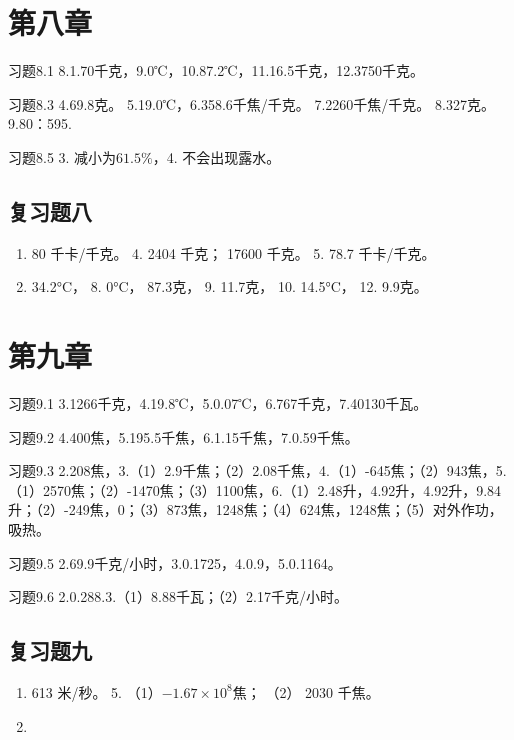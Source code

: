 \section{第八章}\label{ux7b2cux516bux7ae0}

习题8.1 8.1.70千克，9.0℃，10.87.2℃，11.16.5千克，12.3750千克。

习题8.3 4.69.8克。 5.19.0℃，6.358.6千焦/千克。 7.2260千焦/千克。
8.327克。 9.80：595.

习题8.5 3. 减小为\(61.5\%\)，4. 不会出现露水。

\subsection{复习题八}\label{ux590dux4e60ux9898ux516b-1}

\begin{enumerate}
\def\labelenumi{\arabic{enumi}.}
\setcounter{enumi}{2}
\item
  80 千卡/千克。 4. 2404 千克； 17600 千克。 5. 78.7 千卡/千克。
\item
  34.2°C， 8. 0°C， 87.3克， 9. 11.7克， 10. 14.5°C， 12. 9.9克。
\end{enumerate}

\section{第九章}\label{ux7b2cux4e5dux7ae0}

习题9.1 3.1266千克，4.19.8℃，5.0.07℃，6.767千克，7.40130千瓦。

习题9.2 4.400焦，5.195.5千焦，6.1.15千焦，7.0.59千焦。

习题9.3
2.208焦，3.（1）2.9千焦；（2）2.08千焦，4.（1）-645焦；（2）943焦，5.（1）2570焦；（2）-1470焦；（3）1100焦，6.（1）2.48升，4.92升，4.92升，9.84升；（2）-249焦，0；（3）873焦，1248焦；（4）624焦，1248焦；（5）对外作功，吸热。

习题9.5 2.69.9千克/小时，3.0.1725，4.0.9，5.0.1164。

习题9.6 2.0.288.3.（1）8.88千瓦；（2）2.17千克/小时。

\subsection{复习题九}\label{ux590dux4e60ux9898ux4e5d-1}

\begin{enumerate}
\def\labelenumi{\arabic{enumi}.}
\setcounter{enumi}{2}
\item
  613 米/秒。 5. （1）\(-1.67 \times 10^{8}\)焦； （2） 2030 千焦。
\item
\end{enumerate}

